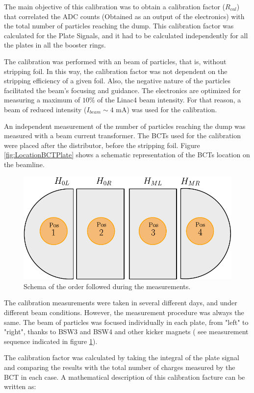 The main objective of this calibration was to obtain a calibration factor ($R_{cal}$) that correlated the ADC counts (Obtained as an output of the electronics) with the total number of particles reaching the dump. This calibration factor was calculated for the Plate Signals, and it had to be calculated independently for all the plates in all the booster rings. 

The calibration was performed with an \hm beam of particles, that is, without stripping foil. In this way, the calibration factor was not dependent on the stripping efficiency of a given foil. Also, the negative nature of the \hm particles facilitated the beam's focusing and guidance. The electronics are optimized for measuring a maximum of $10 \%$ of the Linac4 beam intensity. For that reason, a beam of reduced intensity ($I_{beam} \sim 4$ mA) was used for the calibration.  

An independent measurement of the number of particles reaching the dump was measured with a beam current transformer. The BCTs used for the calibration were placed after the distributor, before the stripping foil. Figure \ref{fig:LocationBCTPlate} shows a schematic representation of the BCTs location on the beamline.

\begin{figure}[h]
    \centering
    \includegraphics[width=0.5\columnwidth]{Figure_OrderMeasurement/OrderMeas.pdf}
    \caption{Schema of the order followed during the measurements. }
    \label{fig:MeasSeq}
\end{figure}

The calibration measurements were taken in several different days, and under different beam conditions. However, the measurement procedure was always the same. The beam of particles was focused individually in each plate, from "left" to "right", thanks to BSW3 and BSW4 and other kicker magnets ( see measurement sequence indicated in figure \ref{fig:MeasSeq}). 

The calibration factor was calculated by taking the integral of the plate signal and comparing the results with the total number of charges measured by the BCT in each case. A mathematical description of this calibration facture can be written as: 

